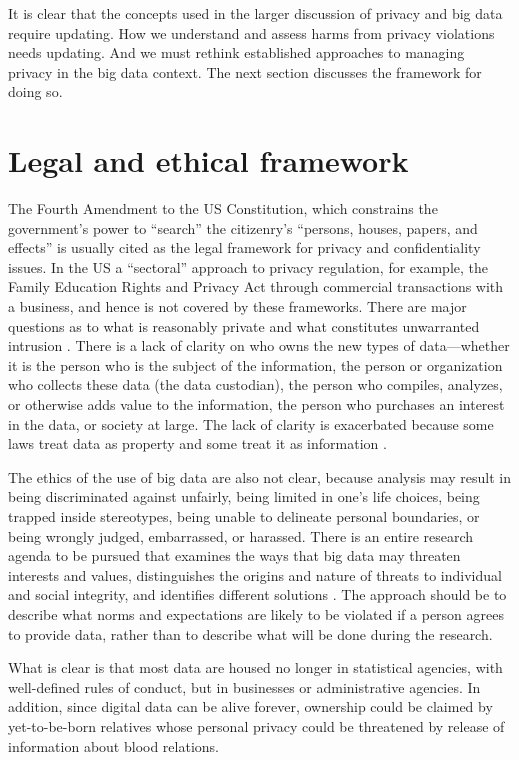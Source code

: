 \documentclass[]{krantz}
\begin{document}
It is clear that the concepts used in the larger discussion of privacy
and big data require updating. How we understand and assess harms from
privacy violations needs updating. And we must rethink established
approaches to managing privacy in the big data context. The next section
discusses the framework for doing so.

\section{Legal and ethical framework}\label{legal-and-ethical-framework}

The Fourth Amendment to the US Constitution, which constrains the
government's power to ``search'' the citizenry's ``persons, houses,
papers, and effects'' is usually cited as the legal framework for
privacy and confidentiality issues. In the US a ``sectoral'' approach to
privacy regulation, for example, the Family Education Rights and Privacy
Act through commercial transactions with a business, and hence is not
covered by these frameworks. There are major questions as to what is
reasonably private and what constitutes unwarranted intrusion
\citep{Strandburg2014}. There is a lack of clarity on who owns the new
types of data---whether it is the person who is the subject of the
information, the person or organization who collects these data (the
data custodian), the person who compiles, analyzes, or otherwise adds
value to the information, the person who purchases an interest in the
data, or society at large. The lack of clarity is exacerbated because
some laws treat data as property and some treat it as information
\citep{Cecil2003}.

The ethics of the use of big data are also not clear, because analysis
may result in being discriminated against unfairly, being limited in
one's life choices, being trapped inside stereotypes, being unable to
delineate personal boundaries, or being wrongly judged, embarrassed, or
harassed. There is an entire research agenda to be pursued that examines
the ways that big data may threaten interests and values, distinguishes
the origins and nature of threats to individual and social integrity,
and identifies different solutions \citep{boyd2012critical}. The
approach should be to describe what norms and expectations are likely to
be violated if a person agrees to provide data, rather than to describe
what will be done during the research.

What is clear is that most data are housed no longer in statistical
agencies, with well-defined rules of conduct, but in businesses or
administrative agencies. In addition, since digital data can be alive
forever, ownership could be claimed by yet-to-be-born relatives whose
personal privacy could be threatened by release of information about
blood relations.
\end{document}
